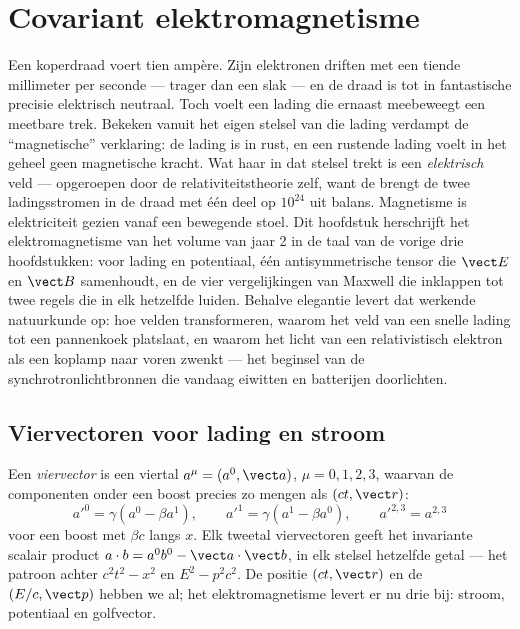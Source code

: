 \chapter{Covariant elektromagnetisme}\label{ch:b3:covariant-electromagnetism}

Een koperdraad voert tien ampère. Zijn elektronen driften met een tiende
millimeter per seconde --- trager dan een slak --- en de draad is tot in
fantastische precisie elektrisch neutraal. Toch voelt een lading die
ernaast meebeweegt een meetbare trek. Bekeken vanuit het eigen stelsel van
die lading verdampt de ``magnetische'' verklaring: de lading is in rust,
en een rustende lading voelt in het geheel geen magnetische kracht. Wat
haar in dat stelsel trekt is een \emph{elektrisch} veld --- opgeroepen
door de relativiteitstheorie zelf, want de  brengt de twee
ladingsstromen in de draad met één deel op $10^{24}$ uit balans.
Magnetisme is elektriciteit gezien vanaf een bewegende stoel. Dit
hoofdstuk herschrijft het elektromagnetisme van het volume van jaar 2 in
de taal van de vorige drie hoofdstukken:  voor lading en
potentiaal, één antisymmetrische tensor die $\vect E$ en $\vect B$
samenhoudt, en de vier vergelijkingen van Maxwell die inklappen tot twee
regels die in elk  hetzelfde luiden. Behalve elegantie
levert dat werkende natuurkunde op: hoe velden transformeren, waarom het
veld van een snelle lading tot een pannenkoek platslaat, en waarom het
licht van een relativistisch elektron als een koplamp naar voren zwenkt
--- het beginsel van de synchrotronlichtbronnen die vandaag eiwitten en
batterijen doorlichten.

\section{Viervectoren voor lading en stroom}

\begin{definition}[Viervectoren]\label{def:b3:covariant-electromagnetism:fourvector}
Een \emph{viervector} is een viertal $a^\mu = (a^0, \vect a)$, $\mu =
0, 1, 2, 3$, waarvan de componenten onder een boost precies zo mengen als
$(ct,
\vect r)$:
\[
a'^0 = \gamma(a^0 - \beta a^1) , \qquad
a'^1 = \gamma(a^1 - \beta a^0) , \qquad
a'^{2,3} = a^{2,3}
\]
voor een boost met $\beta c$ langs $x$. Elk tweetal viervectoren geeft
het invariante scalair product $a\cdot b = a^0b^0 - \vect a\cdot\vect b$,
in elk stelsel hetzelfde getal --- het patroon achter $c^2t^2 - x^2$ en
$E^2 - p^2c^2$. De positie $(ct, \vect r)$ en de 
$(E/c, \vect p)$ hebben we al; het elektromagnetisme levert er nu drie
bij: stroom, potentiaal en golfvector.
\end{definition}

